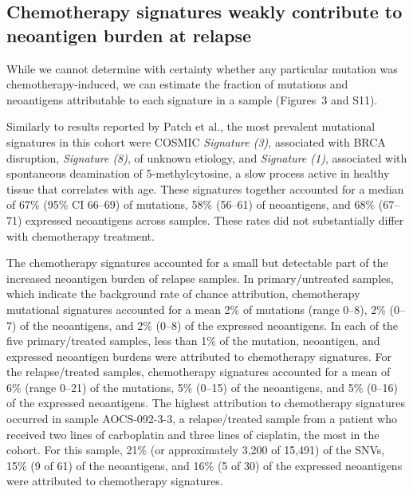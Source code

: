 \documentclass{bmcart}
\begin{document}
\subsection*{Chemotherapy signatures weakly contribute to neoantigen burden at relapse}


While we cannot determine with certainty whether any particular mutation was chemotherapy-induced, we can estimate the fraction of mutations and neoantigens attributable to each signature in a sample (Figures~3 and S11).

Similarly to results reported by Patch et al., the most prevalent mutational signatures in this cohort were COSMIC \textit{Signature (3)}, associated with BRCA disruption, \textit{Signature (8)}, of unknown etiology, and \textit{Signature (1)}, associated with spontaneous deamination of 5-methylcytosine, a slow process active in healthy tissue that correlates with age. These signatures together accounted for a median of 67\% (95\% CI 66--69) of mutations, 58\% (56--61) of neoantigens, and 68\% (67--71) expressed neoantigens across samples. These rates did not substantially differ with chemotherapy treatment.

The chemotherapy signatures accounted for a small but detectable part of the increased neoantigen burden of relapse samples. In primary/untreated samples, which indicate the background rate of chance attribution, chemotherapy mutational signatures accounted for a mean 2\% of mutations (range 0--8), 2\% (0--7) of the neoantigens, and 2\% (0--8) of the expressed neoantigens. In each of the five primary/treated samples, less than 1\% of the mutation, neoantigen, and expressed neoantigen burdens were attributed to chemotherapy signatures. For the relapse/treated samples, chemotherapy signatures accounted for a mean of 6\% (range 0--21) of the mutations, 5\% (0--15) of the neoantigens, and 5\% (0--16) of the expressed neoantigens. The highest attribution to chemotherapy signatures occurred in sample AOCS-092-3-3, a relapse/treated sample from a patient who received two lines of carboplatin and three lines of cisplatin, the most in the cohort. For this sample, 21\% (or approximately 3,200 of 15,491) of the SNVs, 15\% (9 of 61) of the neoantigens, and 16\% (5 of 30) of the expressed neoantigens were attributed to chemotherapy signatures.
\end{document}
